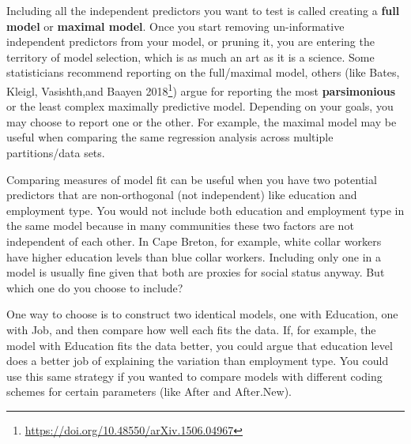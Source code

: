 \documentclass[
  10pt,
  letterpaper]{article}
\renewcommand\texttt[1]{{\ttfamily\color{BrickRed}#1}}
\DeclareRobustCommand{\href}[2]{#2\footnote{\url{#1}}}
\begin{document}
\begin{tcolorbox}[enhanced jigsaw, colbacktitle=quarto-callout-tip-color!10!white, left=2mm, breakable, opacityback=0, toprule=.15mm, titlerule=0mm, bottomtitle=1mm, colframe=quarto-callout-tip-color-frame, opacitybacktitle=0.6, coltitle=black, leftrule=.75mm, toptitle=1mm, rightrule=.15mm, title=\textcolor{quarto-callout-tip-color}{\faLightbulb}\hspace{0.5em}{Which model is best?}, bottomrule=.15mm, colback=white, arc=.35mm]

Including all the independent predictors you want to test is called
creating a \textbf{full model} or \textbf{maximal model}. Once you start
removing un-informative independent predictors from your model, or
pruning it, you are entering the territory of model selection, which is
as much an art as it is a science. Some statisticians recommend
reporting on the full/maximal model, others (like
\href{https://doi.org/10.48550/arXiv.1506.04967}{Bates, Kleigl,
Vasishth,and Baayen 2018}) argue for reporting the most
\textbf{parsimonious} or the least complex maximally predictive model.
Depending on your goals, you may choose to report one or the other. For
example, the maximal model may be useful when comparing the same
regression analysis across multiple partitions/data sets.

Comparing measures of model fit can be useful when you have two
potential predictors that are non-orthogonal (not independent) like
education and employment type. You would not include both education and
employment type in the same model because in many communities these two
factors are not independent of each other. In Cape Breton, for example,
white collar workers have higher education levels than blue collar
workers. Including only one in a model is usually fine given that both
are proxies for social status anyway. But which one do you choose to
include?

One way to choose is to construct two identical models, one with
\texttt{Education}, one with \texttt{Job}, and then compare how well
each fits the data. If, for example, the model with \texttt{Education}
fits the data better, you could argue that education level does a better
job of explaining the variation than employment type. You could use this
same strategy if you wanted to compare models with different coding
schemes for certain parameters (like \texttt{After} and
\texttt{After.New}).


\end{tcolorbox}
\end{document}
